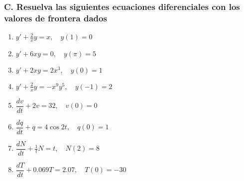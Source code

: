 \documentclass[a4paper,12pt]{article}
\begin{document}
\subsubsection*{C. Resuelva las siguientes ecuaciones diferenciales con los valores de frontera dados}

\begin{enumerate}
    \item $y' + \tfrac{2}{x}y = x, \quad y(1) = 0$
    \item $y' + 6xy = 0, \quad y(\pi) = 5$
    \item $y' + 2xy = 2x^3, \quad y(0) = 1$
    \item $y' + \tfrac{2}{x}y = -x^9 y^5, \quad y(-1) = 2$
    \item $\dfrac{dv}{dt} + 2v = 32, \quad v(0) = 0$
    \item $\dfrac{dq}{dt} + q = 4\cos 2t, \quad q(0) = 1$
    \item $\dfrac{dN}{dt} + \tfrac{1}{t}N = t, \quad N(2) = 8$
    \item $\dfrac{dT}{dt} + 0.069T = 2.07, \quad T(0) = -30$
\end{enumerate}
\end{document}

